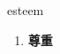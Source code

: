 
\begin{frame}
{\huge esteem}
\begin{center}
\begin{enumerate}\Large
  \item \textbf{尊重}
\end{enumerate}
\end{center}
\end{frame}
